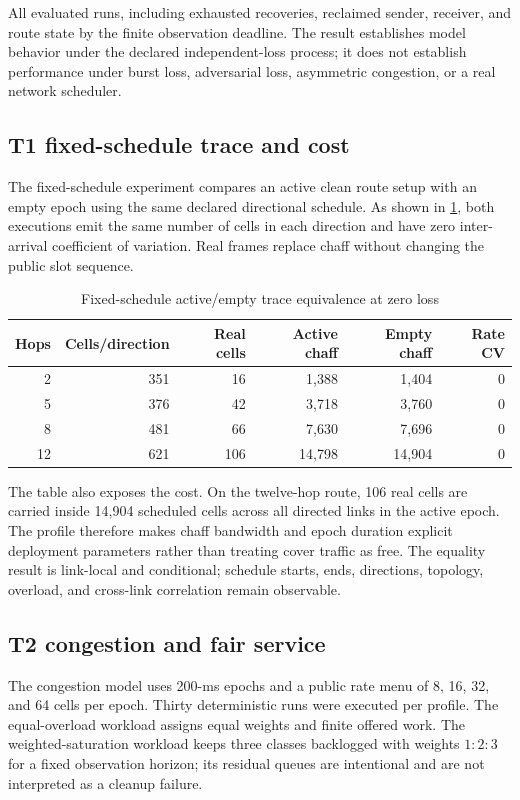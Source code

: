\documentclass[11pt,oneside]{article}
\begin{document}
All evaluated runs, including exhausted recoveries, reclaimed sender, receiver, and route state by the finite observation deadline. The result establishes model behavior under the declared independent-loss process; it does not establish performance under burst loss, adversarial loss, asymmetric congestion, or a real network scheduler.

\subsection{T1 fixed-schedule trace and cost}

The fixed-schedule experiment compares an active clean route setup with an empty epoch using the same declared directional schedule. As shown in \cref{tab:t1trace}, both executions emit the same number of cells in each direction and have zero inter-arrival coefficient of variation. Real frames replace chaff without changing the public slot sequence.

\begin{table}[ht]
\centering
\caption{Fixed-schedule active/empty trace equivalence at zero loss}
\label{tab:t1trace}
\begin{tabular}{@{}rrrrrr@{}}
\toprule
Hops & Cells/direction & Real cells & Active chaff & Empty chaff & Rate CV \\
\midrule
2  & 351 & 16  & 1,388  & 1,404  & 0 \\
5  & 376 & 42  & 3,718  & 3,760  & 0 \\
8  & 481 & 66  & 7,630  & 7,696  & 0 \\
12 & 621 & 106 & 14,798 & 14,904 & 0 \\
\bottomrule
\end{tabular}
\end{table}

The table also exposes the cost. On the twelve-hop route, 106 real cells are carried inside 14,904 scheduled cells across all directed links in the active epoch. The profile therefore makes chaff bandwidth and epoch duration explicit deployment parameters rather than treating cover traffic as free. The equality result is link-local and conditional; schedule starts, ends, directions, topology, overload, and cross-link correlation remain observable.

\subsection{T2 congestion and fair service}

The congestion model uses 200-ms epochs and a public rate menu of 8, 16, 32, and 64 cells per epoch. Thirty deterministic runs were executed per profile. The equal-overload workload assigns equal weights and finite offered work. The weighted-saturation workload keeps three classes backlogged with weights $1{:}2{:}3$ for a fixed observation horizon; its residual queues are intentional and are not interpreted as a cleanup failure.
\end{document}
